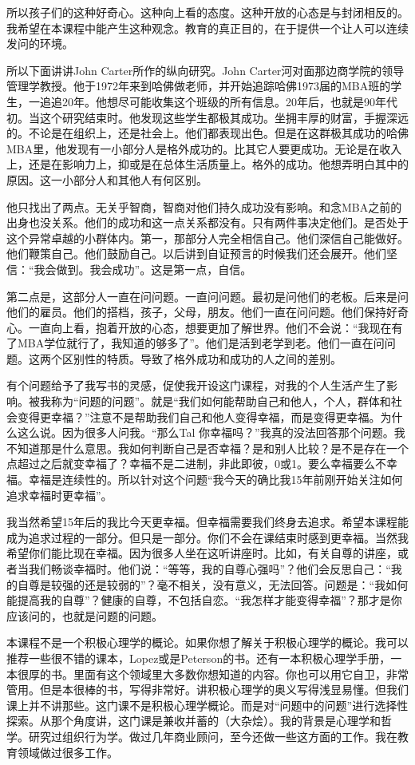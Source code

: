 所以孩子们的这种好奇心。这种向上看的态度。这种开放的心态是与封闭相反的。我希望在本课程中能产生这种观念。教育的真正目的，在于提供一个让人可以连续发问的环境。

所以下面讲讲John Carter所作的纵向研究。John Carter河对面那边商学院的领导管理学教授。他于1972年来到哈佛做老师，并开始追踪哈佛1973届的MBA班的学生，一追追20年。他想尽可能收集这个班级的所有信息。20年后，也就是90年代初。当这个研究结束时。他发现这些学生都极其成功。坐拥丰厚的财富，手握深远的。不论是在组织上，还是社会上。他们都表现出色。但是在这群极其成功的哈佛MBA里，他发现有一小部分人是格外成功的。比其它人要更成功。无论是在收入上，还是在影响力上，抑或是在总体生活质量上。格外的成功。他想弄明白其中的原因。这一小部分人和其他人有何区别。 

他只找出了两点。无关乎智商，智商对他们持久成功没有影响。和念MBA之前的出身也没关系。他们的成功和这一点关系都没有。只有两件事决定他们。是否处于这个异常卓越的小群体内。第一，那部分人完全相信自己。他们深信自己能做好。他们鞭策自己。他们鼓励自己。以后讲到自证预言的时候我们还会展开。他们坚信：“我会做到。我会成功”。这是第一点，自信。

第二点是，这部分人一直在问问题。一直问问题。最初是问他们的老板。后来是问他们的雇员。他们的搭档，孩子，父母，朋友。他们一直在问问题。他们保持好奇心。一直向上看，抱着开放的心态，想要更加了解世界。他们不会说：“我现在有了MBA学位就行了，我知道的够多了”。他们是活到老学到老。他们一直在问问题。这两个区别性的特质。导致了格外成功和成功的人之间的差别。

有个问题给予了我写书的灵感，促使我开设这门课程，对我的个人生活产生了影响。被我称为“问题的问题”。就是“我们如何能帮助自己和他人，个人，群体和社会变得更幸福？”注意不是帮助我们自己和他人变得幸福，而是变得更幸福。为什么这么说。因为很多人问我。“那么Tal 你幸福吗？”我真的没法回答那个问题。我不知道那是什么意思。我如何判断自己是否幸福？是和别人比较？是不是存在一个点超过之后就变幸福了？幸福不是二进制，非此即彼，0或1。要么幸福要么不幸福。幸福是连续性的。所以针对这个问题“我今天的确比我15年前刚开始关注如何追求幸福时更幸福”。

我当然希望15年后的我比今天更幸福。但幸福需要我们终身去追求。希望本课程能成为追求过程的一部分。但只是一部分。你们不会在课结束时感到更幸福。当然我希望你们能比现在幸福。因为很多人坐在这听讲座时。比如，有关自尊的讲座，或者当我们畅谈幸福时。他们说：“等等，我的自尊心强吗”？他们会反思自己：“我的自尊是较强的还是较弱的”？毫不相关，没有意义，无法回答。问题是：“我如何能提高我的自尊”？健康的自尊，不包括自恋。“我怎样才能变得幸福”？那才是你应该问的，也就是问题的问题。

本课程不是一个积极心理学的概论。如果你想了解关于积极心理学的概论。我可以推荐一些很不错的课本，Lopez或是Peterson的书。还有一本积极心理学手册，一本很厚的书。里面有这个领域里大多数你想知道的内容。你也可以用它自卫，非常管用。但是本很棒的书，写得非常好。讲积极心理学的奥义写得浅显易懂。但我们课上并不讲那些。这门课不是积极心理学概论。而是对“问题中的问题”进行选择性探索。从那个角度讲，这门课是兼收并蓄的（大杂烩）。我的背景是心理学和哲学。研究过组织行为学。做过几年商业顾问，至今还做一些这方面的工作。我在教育领域做过很多工作。 


